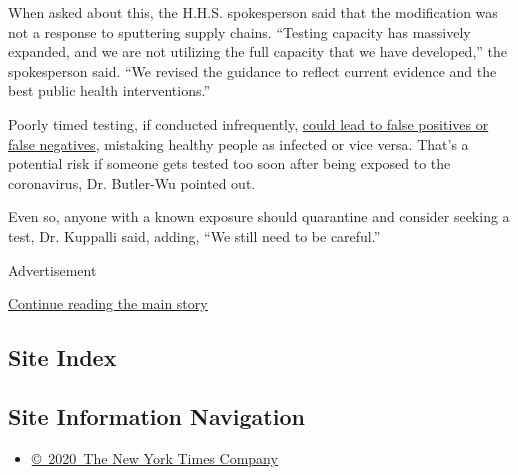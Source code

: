 When asked about this, the H.H.S. spokesperson said that the
modification was not a response to sputtering supply chains. ``Testing
capacity has massively expanded, and we are not utilizing the full
capacity that we have developed,'' the spokesperson said. ``We revised
the guidance to reflect current evidence and the best public health
interventions.''

Poorly timed testing, if conducted infrequently,
\href{https://www.nytimes3xbfgragh.onion/2020/08/09/health/covid-testing.html}{could
lead to false positives or false negatives}, mistaking healthy people as
infected or vice versa. That's a potential risk if someone gets tested
too soon after being exposed to the coronavirus, Dr. Butler-Wu pointed
out.

Even so, anyone with a known exposure should quarantine and consider
seeking a test, Dr. Kuppalli said, adding, ``We still need to be
careful.''

Advertisement

\protect\hyperlink{after-bottom}{Continue reading the main story}

\hypertarget{site-index}{%
\subsection{Site Index}\label{site-index}}

\hypertarget{site-information-navigation}{%
\subsection{Site Information
Navigation}\label{site-information-navigation}}

\begin{itemize}
\tightlist
\item
  \href{https://help.nytimes3xbfgragh.onion/hc/en-us/articles/115014792127-Copyright-notice}{©~2020~The
  New York Times Company}
\end{itemize}

